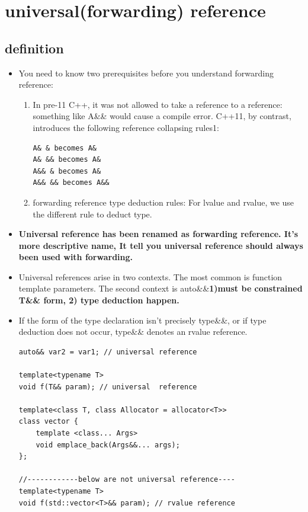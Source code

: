 \documentclass[a4paper,11pt,twoside]{book}
\begin{document}
\section{universal(forwarding) reference }
\subsection{definition}
\begin{itemize}
\item You need to know two prerequisites before you understand forwarding reference:

\begin{enumerate}
	\item In pre-11 C++, it was not allowed to take a reference to a reference: something like A\&\& would cause a compile error. C++11, by contrast, introduces the following reference collapsing rules1:
	
\begin{lstlisting}[numbers=none]
A& & becomes A&
A& && becomes A&
A&& & becomes A&
A&& && becomes A&&
\end{lstlisting}
	
	\item forwarding reference type deduction rules: For lvalue and rvalue, we use the different rule to deduct type.
\end{enumerate}

\item \textbf{Universal reference has been renamed as forwarding reference. It's more descriptive name, It tell you universal reference should always been used with forwarding.}

\item  Universal references arise in two contexts. The most common is function template parameters. The second context is auto\&\&\textbf{1)must be constrained T\&\& form, 2) type deduction happen.}

\item If the form of the type declaration isn't precisely type\&\&, or if type deduction does not occur, type\&\& denotes an rvalue reference.
\begin{lstlisting}
auto&& var2 = var1; // universal reference

template<typename T>
void f(T&& param); // universal  reference

template<class T, class Allocator = allocator<T>>
class vector {
	template <class... Args>
	void emplace_back(Args&&... args);  
};

//------------below are not universal reference----
template<typename T>
void f(std::vector<T>&& param); // rvalue reference


\end{lstlisting}
\end{itemize}
\end{document}

